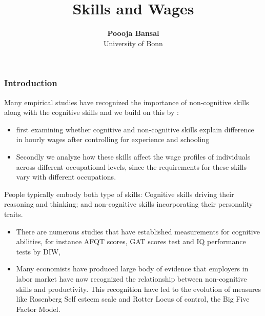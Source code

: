\documentclass[11pt]{beamer}
\begin{document}
\title{Skills and Wages}

\author[Poooja Bansal]
{
{\bf Poooja Bansal}\\
{\small University of Bonn}\\[1ex]
}


\begin{frame}
    \titlepage
    \note{~}
\end{frame}


\begin{frame}[t]
    \frametitle{Introduction}
Many empirical studies have recognized the importance of
non-cognitive skills along with the cognitive skills and we build on this
by :

	\begin{itemize}

		\item first examining whether cognitive and non-cognitive skills explain
difference in hourly wages after controlling for experience and
schooling

		\item Secondly we analyze how these skills affect the wage profiles of
individuals across different occupational levels, since the
requirements for these skills vary with different occupations.
 	\end{itemize}
    	\note{~}
\end{frame}

\begin{frame}[t]

People typically embody both type of skills: Cognitive skills driving their reasoning
and thinking; and non-cognitive skills incorporating their personality traits.
 	\begin{itemize}


		\item There are numerous studies that have established measurements for cognitive
abilities, for instance AFQT scores, GAT scores test and IQ performance tests by
DIW,

		\item Many economists have produced large body of evidence that employers in labor
market have now recognized the relationship between non-cognitive skills and
productivity. This recognition have led to the evolution of measures like
Rosenberg Self esteem scale and Rotter Locus of control, the Big Five Factor
Model.
 	\end{itemize}
\end{frame}
\end{document}
